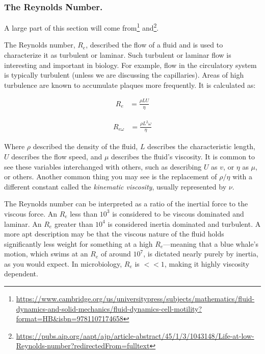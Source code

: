 \documentclass[12pt]{report}
\begin{document}
\subsubsection{The Reynolds Number.}

A large part of this section will come from\footnote{\url{https://www.cambridge.org/us/universitypress/subjects/mathematics/fluid-dynamics-and-solid-mechanics/fluid-dynamics-cell-motility?format=HB&isbn=9781107174658}} and\footnote{\url{https://pubs.aip.org/aapt/ajp/article-abstract/45/1/3/1043148/Life-at-low-Reynolds-number?redirectedFrom=fulltext}}.\newline

The Reynolds number, $R_e$, described the flow of a fluid and is used to characterize it as turbulent or laminar. Such turbulent or laminar flow is interesting and important in biology. For example, flow in the circulatory system is typically turbulent (unless we are discussing the capillaries). Areas of high turbulence are known to accumulate plaques more frequently. It is calculated as: 

\nopagebreak

\begin{equation} \label{Redefinition}
\begin{split}
R_e & = \frac{\rho LU}{\eta}
\end{split}
\end{equation}

\begin{equation} \label{Redefinition2}
\begin{split}
R_{e\omega} & = \frac{\rho L^2\omega}{\eta}
\end{split}
\end{equation}

\nopagebreak

Where $\rho$ described the density of the fluid, $L$ describes the characteristic length, $U$ describes the flow speed, and $\mu$ describes the fluid's viscosity. It is common to see these variables interchanged with others, such as describing $U$ as $v$, or $\eta$ as $\mu$, or others. Another common thing you may see is the replacement of $\rho / \eta$ with a different constant called the \textit{kinematic viscosity}, usually represented by $\nu$. \newline

The Reynolds number can be interpreted as a ratio of the inertial force to the viscous force. An $R_e$ less than $10^3$ is considered to be viscous dominated and laminar. An $R_e$ greater than $10^4$ is considered inertia dominated and turbulent. A more apt description may be that the viscous nature of the fluid holds significantly less weight for something at a high $R_e$---meaning that a blue whale's motion, which swims at an $R_e$ of around $10^7$, is dictated nearly purely by inertia, as you would expect. In microbiology, $R_e$ is $<< 1$, making it highly viscosity dependent.\newline
\end{document}
